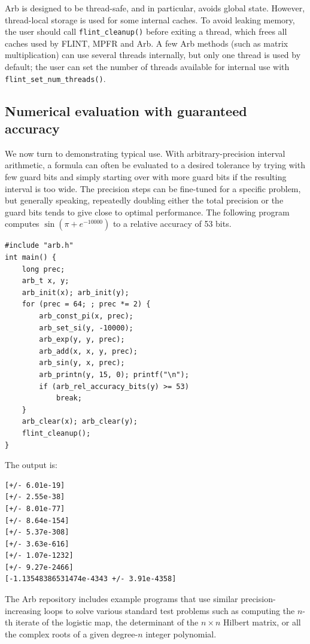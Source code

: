 \documentclass[10pt,journal,compsoc,cspaper]{IEEEtran}
\begin{document}
Arb is designed to be thread-safe, and in particular, avoids
global state.
However, thread-local storage is used for some internal caches.
To avoid leaking memory, the user should call \texttt{flint\_cleanup()}
before exiting a thread, which frees all caches used by FLINT,
MPFR and Arb.
A few Arb methods (such as matrix multiplication) can use several
threads internally, but only one thread is used by default; the user can set the number
of threads available for internal use with \texttt{flint\_set\_num\_threads()}.

\subsection{Numerical evaluation with guaranteed accuracy}

We now turn to demonstrating typical use.
With arbitrary-precision interval arithmetic,
a formula can often be evaluated to 
a desired tolerance by trying with few guard bits
and simply starting over with more guard bits if the resulting interval
is too wide.
The precision steps can be fine-tuned for a specific problem,
but generally speaking,
repeatedly doubling either the total precision or the guard bits
tends to give close to optimal performance.
The following program computes $\sin(\pi + e^{-10000})$
to a relative accuracy of 53 bits.

\begin{small}
\begin{verbatim}
#include "arb.h"
int main() {
    long prec;
    arb_t x, y;
    arb_init(x); arb_init(y);
    for (prec = 64; ; prec *= 2) {
        arb_const_pi(x, prec);
        arb_set_si(y, -10000);
        arb_exp(y, y, prec);
        arb_add(x, x, y, prec);
        arb_sin(y, x, prec);
        arb_printn(y, 15, 0); printf("\n");
        if (arb_rel_accuracy_bits(y) >= 53)
            break;
    }
    arb_clear(x); arb_clear(y);
    flint_cleanup();
}
\end{verbatim}
\end{small}

The output is:

\begin{small}
\begin{verbatim}
[+/- 6.01e-19]
[+/- 2.55e-38]
[+/- 8.01e-77]
[+/- 8.64e-154]
[+/- 5.37e-308]
[+/- 3.63e-616]
[+/- 1.07e-1232]
[+/- 9.27e-2466]
[-1.13548386531474e-4343 +/- 3.91e-4358]
\end{verbatim}
\end{small}

The Arb repository
includes example programs that use similar precision-increasing
loops to solve various standard test problems 
such as computing the
$n$-th iterate of the logistic map, the determinant of the $n \times n$
Hilbert matrix, or all the complex roots of a given degree-$n$ integer polynomial.
\end{document}
